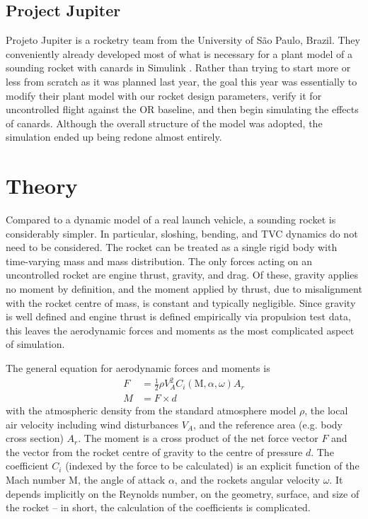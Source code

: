 \subsection{Project Jupiter}
Projeto Jupiter is a rocketry team from the University of São Paulo, Brazil. They conveniently already developed most of what is necessary for a plant model of a sounding rocket with canards in Simulink \cite{jupiter-canards}. Rather than trying to start more or less from scratch as it was planned last year, the goal this year was essentially to modify their plant model with our rocket design parameters, verify it for uncontrolled flight against the OR baseline, and then begin simulating the effects of canards.
Although the overall structure of the model was adopted, the simulation ended up being redone almost entirely.

\section{Theory}
Compared to a dynamic model of a real launch vehicle, a sounding rocket is considerably simpler. In particular, sloshing, bending, and TVC dynamics do not need to be considered. The rocket can be treated as a single rigid body with time-varying mass and mass distribution. The only forces acting on an uncontrolled rocket are engine thrust, gravity, and drag. Of these, gravity applies no moment by definition, and the moment applied by thrust, due to misalignment with the rocket centre of mass, is constant and typically negligible. Since gravity is well defined and engine thrust is defined empirically via propulsion test data, this leaves the aerodynamic forces and moments as the most complicated aspect of simulation.

The general equation for aerodynamic forces and moments is 
\begin{align}
    F &= \frac{1}{2} \rho V_A^2 C_i(\mathrm{M}, \alpha, \omega) A_r \label{eq:plant-theory-force}
    \\
    M &= F \times d \label{eq:plant-theory-moment}
\end{align}
with the atmospheric density from the standard atmosphere model $\rho$, the local air velocity including wind disturbances $V_A$, and the reference area (e.g. body cross section) $A_r$.
The moment is a cross product of the net force vector $F$ and the vector from the rocket centre of gravity to the centre of pressure $d$.
The coefficient $C_i$ (indexed by the force to be calculated) is an explicit function of the Mach number $\mathrm{M}$, the angle of attack $\alpha$, and the rockets angular velocity $\omega$. 
It depends implicitly on the Reynolds number, on the geometry, surface, and size of the rocket -- in short, the calculation of the coefficients is complicated.


